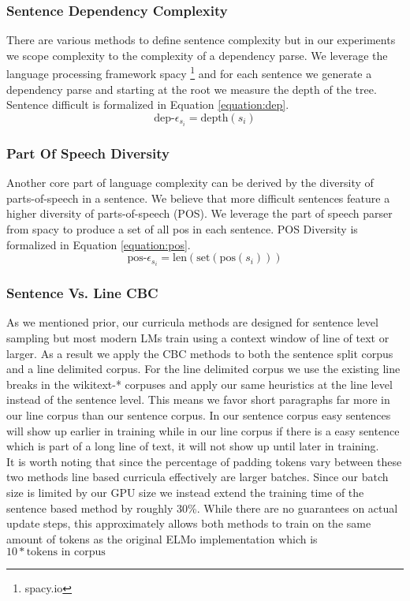 \subsubsection{Sentence Dependency Complexity}
There are various methods to define sentence complexity but in our experiments we scope complexity to the complexity of a dependency parse. We leverage the language processing framework spacy \footnote{spacy.io} and for each sentence we generate a dependency parse and starting at the root we measure the depth of the tree. Sentence difficult is formalized in Equation \ref{equation:dep}.
\begin{equation}
    \text{dep-}\epsilon_{s_i} = \text{depth}(s_i)
    \label{equation:dep}
\end{equation}
\subsubsection{Part Of Speech Diversity}
Another core part of language complexity can be derived by the diversity of parts-of-speech in a sentence. We believe that more difficult sentences feature a higher diversity of parts-of-speech (POS). We leverage the part of speech parser from spacy to produce a set of all pos in each sentence. POS Diversity is formalized in Equation \ref{equation:pos}.
\begin{equation}
    \text{pos-}\epsilon_{s_i} = \text{len}(\text{set}(\text{pos}({s_i})))
    \label{equation:pos}
\end{equation}
\subsubsection{Sentence Vs. Line CBC}
As we mentioned prior, our curricula methods are designed for sentence level sampling but most modern LMs train using a context window of line of text or larger. As a result we apply the CBC methods to both the sentence split corpus and a line delimited corpus. For the line delimited corpus we use the existing line breaks in the wikitext-* corpuses and apply our same heuristics at the line level instead of the sentence level. This means we favor short paragraphs far more in our line corpus than our sentence corpus. In our sentence corpus easy sentences will show up earlier in training while in our line corpus if there is a easy sentence which is part of a long line of text, it will not show up until later in training. \\
It is worth noting that since the percentage of padding tokens vary between these two methods line based curricula effectively are larger batches. Since our batch size is limited by our GPU size we instead extend the training time of the sentence based method by roughly 30\%. While there are no guarantees on actual update steps, this approximately allows both methods to train on the same amount of tokens as the original ELMo implementation which is $10 * \text{tokens in corpus}$
